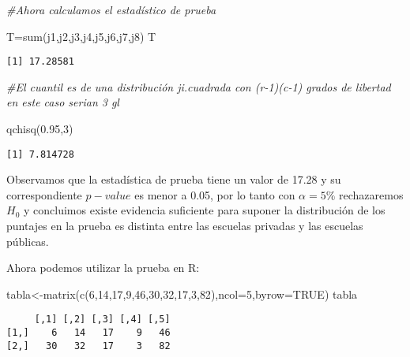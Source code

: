 \documentclass[
  a4paper,
  oneside,
  openany]{book}
\newenvironment{Shaded}{\begin{snugshade}}{\end{snugshade}}
\newcommand{\AttributeTok}[1]{\textcolor[rgb]{0.77,0.63,0.00}{#1}}
\newcommand{\CommentTok}[1]{\textcolor[rgb]{0.56,0.35,0.01}{\textit{#1}}}
\newcommand{\ConstantTok}[1]{\textcolor[rgb]{0.00,0.00,0.00}{#1}}
\newcommand{\DecValTok}[1]{\textcolor[rgb]{0.00,0.00,0.81}{#1}}
\newcommand{\FloatTok}[1]{\textcolor[rgb]{0.00,0.00,0.81}{#1}}
\newcommand{\FunctionTok}[1]{\textcolor[rgb]{0.00,0.00,0.00}{#1}}
\newcommand{\NormalTok}[1]{#1}
\newcommand{\OtherTok}[1]{\textcolor[rgb]{0.56,0.35,0.01}{#1}}
\begin{document}
\begin{Shaded}
\begin{Highlighting}[]
\CommentTok{\#Ahora calculamos el estadístico de prueba}

\NormalTok{T}\OtherTok{=}\FunctionTok{sum}\NormalTok{(j1,j2,j3,j4,j5,j6,j7,j8)}
\NormalTok{T}
\end{Highlighting}
\end{Shaded}

\begin{verbatim}
[1] 17.28581
\end{verbatim}

\begin{Shaded}
\begin{Highlighting}[]
\CommentTok{\#El cuantil es de una distribución ji.cuadrada con (r{-}1)(c{-}1) grados de libertad en este caso serian 3 gl}

\FunctionTok{qchisq}\NormalTok{(}\FloatTok{0.95}\NormalTok{,}\DecValTok{3}\NormalTok{)}
\end{Highlighting}
\end{Shaded}

\begin{verbatim}
[1] 7.814728
\end{verbatim}

Observamos que la estadística de prueba tiene un valor de 17.28 y su correspondiente \(p-value\) es menor a 0.05, por lo tanto con \(\alpha=5\%\) rechazaremos \(H_0\) y concluimos existe evidencia suficiente para suponer la distribución de los puntajes en la prueba es distinta entre las escuelas privadas y las escuelas públicas.

Ahora podemos utilizar la prueba en R:

\begin{Shaded}
\begin{Highlighting}[]
\NormalTok{tabla}\OtherTok{\textless{}{-}}\FunctionTok{matrix}\NormalTok{(}\FunctionTok{c}\NormalTok{(}\DecValTok{6}\NormalTok{,}\DecValTok{14}\NormalTok{,}\DecValTok{17}\NormalTok{,}\DecValTok{9}\NormalTok{,}\DecValTok{46}\NormalTok{,}\DecValTok{30}\NormalTok{,}\DecValTok{32}\NormalTok{,}\DecValTok{17}\NormalTok{,}\DecValTok{3}\NormalTok{,}\DecValTok{82}\NormalTok{),}\AttributeTok{ncol=}\DecValTok{5}\NormalTok{,}\AttributeTok{byrow=}\ConstantTok{TRUE}\NormalTok{)}
\NormalTok{tabla}
\end{Highlighting}
\end{Shaded}

\begin{verbatim}
     [,1] [,2] [,3] [,4] [,5]
[1,]    6   14   17    9   46
[2,]   30   32   17    3   82
\end{verbatim}
\end{document}
